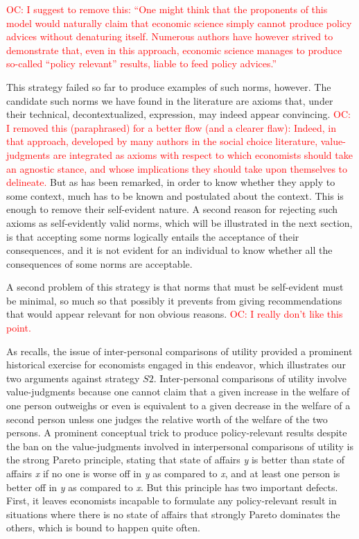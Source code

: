 \documentclass[preprint, french, english, 11pt, authoryear]{elsarticle}%
\newcommand{\commentOC}[1]{\textcolor{red}{OC: #1}}
\begin{document}
\commentOC{I suggest to remove this: “One might think that the proponents of this model would naturally claim that economic science simply cannot produce policy advices without denaturing itself. Numerous authors have however strived to demonstrate that, even in this approach, economic science manages to produce so-called “policy relevant” results, liable to feed policy advices.”}

This strategy failed so far to produce examples of such norms, however. The candidate such norms we have found in the literature are axioms that, under their technical, decontextualized, expression, may indeed appear convincing. \commentOC{I removed this (paraphrased) for a better flow (and a clearer flaw): Indeed, in that approach, developed by many authors in the social choice literature, value-judgments are integrated as axioms with respect to which economists should take an agnostic stance, and whose implications they should take upon themselves to delineate.}
But as has been remarked, in order to know whether they apply to some context, much has to be known and postulated about the context. This is enough to remove their self-evident nature. A second reason for rejecting such axioms as self-evidently valid norms, which will be illustrated in the next section, is that accepting some norms logically entails the acceptance of their consequences, and it is not evident for an individual to know whether all the consequences of some norms are acceptable.

A second problem of this strategy is that norms that must be self-evident must be minimal, so much so that possibly it prevents from giving recommendations that would appear relevant for non obvious reasons. 
\commentOC{I really don’t like this point.}

As \cite{baujard_leconomie_2011} recalls, the issue of inter-personal comparisons of utility provided a prominent historical exercise for economists engaged in this endeavor, which illustrates our two arguments against strategy $S2$. Inter-personal comparisons of utility involve value-judgments because one cannot claim that a given increase in the welfare of one person outweighs or even is equivalent to a given decrease in the welfare of a second person unless one judges the relative worth of the welfare of the two persons. A prominent conceptual trick to produce policy-relevant results despite the ban on the value-judgments involved in interpersonal comparisons of utility is the strong Pareto principle, stating that state of affairs \emph{y} is better than state of affairs \emph{x} if no one is worse off in \emph{y} as compared to \emph{x}, and at least one person is better off in \emph{y} as compared to \emph{x}. But this principle has two important defects. First, it leaves economists incapable to formulate any policy-relevant result in situations where there is no state of affairs that strongly Pareto dominates the others, which is bound to happen quite often. 
\end{document}
